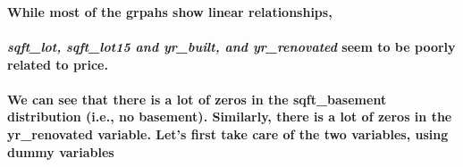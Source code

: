 \documentclass[11pt]{article}
\begin{document}
    \begin{center}
    \end{center}
    { \hspace*{\fill} \\}
    
    \begin{center}
    \end{center}
    { \hspace*{\fill} \\}
    
    \paragraph{While most of the grpahs show linear
relationships,}\label{while-most-of-the-grpahs-show-linear-relationships}

\paragraph{\texorpdfstring{\emph{sqft\_lot, sqft\_lot15 and yr\_built,
and yr\_renovated} seem to be poorly related to
price.}{sqft\_lot, sqft\_lot15 and yr\_built, and yr\_renovated seem to be poorly related to price.}}\label{sqft_lot-sqft_lot15-and-yr_built-and-yr_renovated-seem-to-be-poorly-related-to-price.}

\paragraph{We can see that there is a lot of zeros in the sqft\_basement
distribution (i.e., no basement). Similarly, there is a lot of zeros in
the yr\_renovated variable. Let's first take care of the two variables,
using dummy
variables}\label{we-can-see-that-there-is-a-lot-of-zeros-in-the-sqft_basement-distribution-i.e.-no-basement.-similarly-there-is-a-lot-of-zeros-in-the-yr_renovated-variable.-lets-first-take-care-of-the-two-variables-using-dummy-variables}
\end{document}

